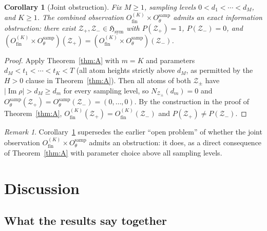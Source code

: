 \documentclass[12pt]{amsart}
\theoremstyle{definition}
\theoremstyle{remark}
\newtheorem{remark}[definition]{Remark}
\theoremstyle{plain}
\newtheorem{maincor}{Corollary}
\newcommand{\Hsym}{\mathfrak{H}_{\mathrm{sym}}}
\newcommand{\Ofinite}{O_{\mathrm{fin}}}
\newcommand{\Otheta}{O_{\theta}^{\mathrm{samp}}}
\newcommand{\im}{\operatorname{Im}}
\begin{document}
\begin{maincor}[Joint obstruction]
\label{cor:E}
Fix $M \geq 1$, sampling levels $0 < d_1 < \cdots < d_M$, and $K \geq 1$.
The combined observation $\Ofinite^{(K)}\times\Otheta$ admits an exact
information obstruction: there exist $\mathcal{Z}_+, \mathcal{Z}_- \in \Hsym$
with $P(\mathcal{Z}_+)=1$, $P(\mathcal{Z}_-)=0$, and
$(\Ofinite^{(K)}\times\Otheta)(\mathcal{Z}_+) =
 (\Ofinite^{(K)}\times\Otheta)(\mathcal{Z}_-)$.
\end{maincor}

\begin{proof}
Apply Theorem~\ref{thm:A} with $m = K$ and parameters $d_M < t_1 < \cdots < t_K < T$
(all atom heights strictly above $d_M$, as permitted by the $H > 0$ clause
in Theorem~\ref{thm:A}).  Then all atoms of both $\mathcal{Z}_\pm$
have $|\im\rho| > d_M \geq d_m$ for every sampling level, so
$N_{\mathcal{Z}_\pm}(d_m) = 0$ and $\Otheta(\mathcal{Z}_+) = \Otheta(\mathcal{Z}_-)
= (0,\ldots,0)$.  By the construction in the proof of Theorem~\ref{thm:A}, $\Ofinite^{(K)}(\mathcal{Z}_+) =
\Ofinite^{(K)}(\mathcal{Z}_-)$ and $P(\mathcal{Z}_+) \neq P(\mathcal{Z}_-)$.
\end{proof}

\begin{remark}
Corollary~\ref{cor:E} supersedes the earlier ``open problem'' of whether the joint
observation $\Ofinite^{(K)}\times\Otheta$ admits an obstruction:
it does, as a direct consequence of Theorem~\ref{thm:A} with parameter choice
above all sampling levels.
\end{remark}

\section{Discussion}

\subsection{What the results say together}
\end{document}
